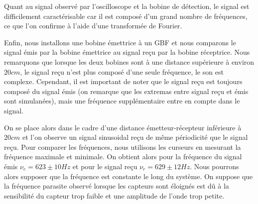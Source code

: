 \documentclass[12pt]{article}
\begin{document}
Quant au signal observé par l'oscilloscope et la bobine de détection, le signal est difficilement caractérisable car il est composé d'un grand nombre de fréquences, ce que
l'on confirme à l'aide d'une transformée de Fourier.

Enfin, nous installons une bobine émettrice à un GBF  et nous comparons le signal émis par la bobine émettrice au signal reçu par la bobine réceptrice.
Nous remarquons que lorsque les deux bobines sont à une distance supérieure à environ $20cm$, le signal reçu n'est plus composé d'une seule fréquence, le son est complexe.
Cependant, il est important de noter que le signal reçu est toujours composé du signal émis (on remarque que les extremas entre signal reçu et émis sont simulanées), mais une fréquence supplémentaire
entre en compte dans le signal. 

On se place alors dans le cadre d'une distance émetteur-récepteur inférieure à $20cm$ et l'on observe un signal sinusoidal reçu de même périodicité que le signal reçu. Pour comparer les fréquences,
nous utilisons les curseurs en mesurant la fréquence maximale et minimale. On obtient alors pour la fréquence du signal émis $\nu_e = 623 \pm 10 Hz$ et pour le signal reçu $\nu_r = 629 \pm 12 Hz$. Nous pourrons alors supposer
que la fréquence est constante le long du système. On suppose que la fréquence parasite observé lorsque les capteurs sont éloignés est dû à la sensibilité du capteur trop faible et une amplitude de l'onde trop petite. 

\break
\end{document}

